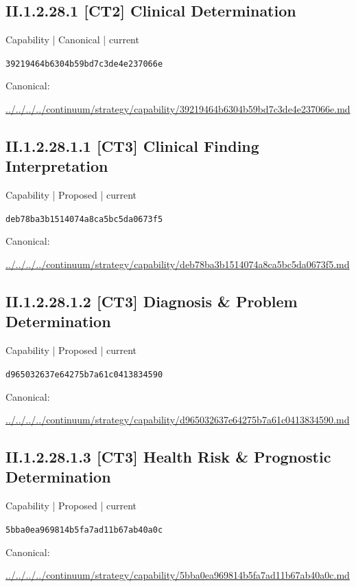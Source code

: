 \documentclass[10pt,a4paper]{article}
\begin{document}
\subsection*{II.1.2.28.1 [CT2] Clinical Determination}
{\small Capability | Canonical | current}\par
\texttt{39219464b6304b59bd7c3de4e237066e}\par
Canonical: \par
{\footnotesize\url{../../../../continuum/strategy/capability/39219464b6304b59bd7c3de4e237066e.md}}\par
\subsection*{II.1.2.28.1.1 [CT3] Clinical Finding Interpretation}
{\small Capability | Proposed | current}\par
\texttt{deb78ba3b1514074a8ca5bc5da0673f5}\par
Canonical: \par
{\footnotesize\url{../../../../continuum/strategy/capability/deb78ba3b1514074a8ca5bc5da0673f5.md}}\par
\subsection*{II.1.2.28.1.2 [CT3] Diagnosis \& Problem Determination}
{\small Capability | Proposed | current}\par
\texttt{d965032637e64275b7a61c0413834590}\par
Canonical: \par
{\footnotesize\url{../../../../continuum/strategy/capability/d965032637e64275b7a61c0413834590.md}}\par
\subsection*{II.1.2.28.1.3 [CT3] Health Risk \& Prognostic Determination}
{\small Capability | Proposed | current}\par
\texttt{5bba0ea969814b5fa7ad11b67ab40a0c}\par
Canonical: \par
{\footnotesize\url{../../../../continuum/strategy/capability/5bba0ea969814b5fa7ad11b67ab40a0c.md}}\par
\end{document}
